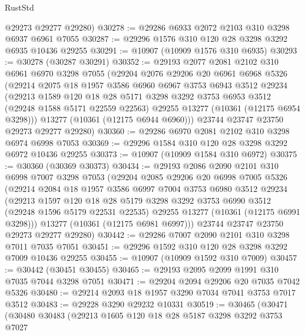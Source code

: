 \begin{lexlean}{RustStd}
\begin{coremodule}
      @29273
      @29277
      @29280)
@30278 := @29286 @6933 @2072 @2103 @310 @3298 @6937 @6961 @7055
@30287 := @29296 @1576 @310 @120 @28 @3298 @3292 @6935 @10436 @29255
@30291 := @10907 (@10909 @1576 @310 @6935)
@30293 := @30278 (@30287 @30291)
@30352 := @29193
    @2077
    @2081
    @2102
    @310
    @6961
    @6970
    @3298
    @7055
    (@29204
      @2076
      @29206
      @20
      @6961
      @6968
      @5326
      (@29214
        @2075
        @18
        @1957
        @3586
        @6960
        @6967
        @3753
        @6943
        @3512
        @29234
        (@29213
          @1589
          @120
          @18
          @28
          @5171
          @3298
          @3292
          @3753
          @6953
          @3512
          (@29248 @1588 @5171 @22559 @22563)
          @29255
          @13277
          (@10361 (@12175 @6954 @3298)))
        @13277
        (@10361 (@12175 @6944 @6960)))
      @23744
      @23747
      @23750
      @29273
      @29277
      @29280)
@30360 := @29286 @6970 @2081 @2102 @310 @3298 @6974 @6998 @7053
@30369 := @29296 @1584 @310 @120 @28 @3298 @3292 @6972 @10436 @29255
@30373 := @10907 (@10909 @1584 @310 @6972)
@30375 := @30360 (@30369 @30373)
@30434 := @29193
    @2086
    @2090
    @2101
    @310
    @6998
    @7007
    @3298
    @7053
    (@29204
      @2085
      @29206
      @20
      @6998
      @7005
      @5326
      (@29214
        @2084
        @18
        @1957
        @3586
        @6997
        @7004
        @3753
        @6980
        @3512
        @29234
        (@29213
          @1597
          @120
          @18
          @28
          @5179
          @3298
          @3292
          @3753
          @6990
          @3512
          (@29248 @1596 @5179 @22531 @22535)
          @29255
          @13277
          (@10361 (@12175 @6991 @3298)))
        @13277
        (@10361 (@12175 @6981 @6997)))
      @23744
      @23747
      @23750
      @29273
      @29277
      @29280)
@30442 := @29286 @7007 @2090 @2101 @310 @3298 @7011 @7035 @7051
@30451 := @29296 @1592 @310 @120 @28 @3298 @3292 @7009 @10436 @29255
@30455 := @10907 (@10909 @1592 @310 @7009)
@30457 := @30442 (@30451 @30455)
@30465 := @29193 @2095 @2099 @1991 @310 @7035 @7044 @3298 @7051
@30471 := @29204 @2094 @29206 @20 @7035 @7042 @5326
@30480 := @29214 @2093 @18 @1957 @3290 @7034 @7041 @3753 @7017 @3512
@30483 := @29228 @3290 @29232 @10331
@30519 := @30465
    (@30471
      (@30480
        @30483
        (@29213
          @1605
          @120
          @18
          @28
          @5187
          @3298
          @3292
          @3753
          @7027

\end{coremodule}
\end{lexlean}
